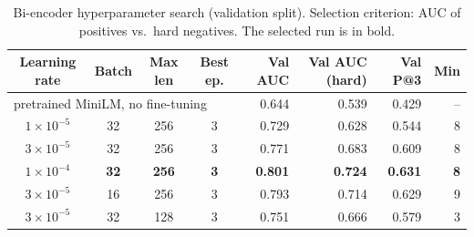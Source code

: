 \begin{table}[H]
\centering\small
\begin{tabularx}{\linewidth}{@{}c c c c r r r r@{}}
\toprule
Learning rate & Batch & Max len & Best ep. & Val AUC & Val AUC (hard) & Val P@3 & Min\\
\midrule
\multicolumn{4}{l}{pretrained MiniLM, no fine-tuning} & 0.644 & 0.539 & 0.429 & --\\
$1\times10^{-5}$ & 32 & 256 & 3 & 0.729 & 0.628 & 0.544 & 8\\
$3\times10^{-5}$ & 32 & 256 & 3 & 0.771 & 0.683 & 0.609 & 8\\
\textbf{$1\times10^{-4}$} & \textbf{32} & \textbf{256} & \textbf{3} & \textbf{0.801} & \textbf{0.724} & \textbf{0.631} & \textbf{8}\\
$3\times10^{-5}$ & 16 & 256 & 3 & 0.793 & 0.714 & 0.629 & 9\\
$3\times10^{-5}$ & 32 & 128 & 3 & 0.751 & 0.666 & 0.579 & 3\\
\bottomrule
\end{tabularx}
\caption{Bi-encoder hyperparameter search (validation split). Selection criterion: AUC of positives vs.\ hard negatives. The selected run is in bold.}\label{tab:bigrid}
\end{table}

